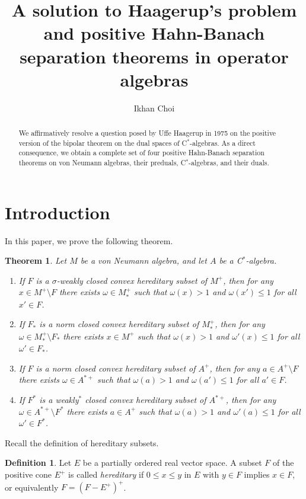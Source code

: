 \documentclass[noamsfonts,a4paper,10pt]{amsart}
\title[Positive Hahn-Banach separation theorems]{A solution to Haagerup's problem and positive Hahn-Banach separation theorems in operator algebras}
\author[I. Choi]{Ikhan Choi}
\theoremstyle{plain}
\newtheorem*{theorem*}{Theorem}
\theoremstyle{definition}
\newtheorem{definition}[theorem]{Definition}
\begin{document}
\begin{abstract}
We affirmatively resolve a question posed by Uffe Haagerup in 1975 on the positive version of the bipolar theorem on the dual spaces of C$^*$-algebras.
As a direct consequence, we obtain a complete set of four positive Hahn-Banach separation theorems on von Neumann algebras, their preduals, C$^*$-algebras, and their duals.
\end{abstract}

\maketitle


\section{Introduction}

In this paper, we prove the following theorem.

\begin{theorem*}
Let $M$ be a von Neumann algebra, and let $A$ be a C$^*$-algebra.
\begin{enumerate}
\item[(1)] If $F$ is a $\sigma$-weakly closed convex hereditary subset of $M^+$, then for any $x\in M^+\setminus F$ there exists $\omega\in M_*^+$ such that $\omega(x)>1$ and $\omega(x')\le1$ for all $x'\in F$.
\item[(2)] If $F_*$ is a norm closed convex hereditary subset of $M_*^+$, then for any $\omega\in M_*^+\setminus F_*$ there exists $x\in M^+$ such that $\omega(x)>1$ and $\omega'(x)\le1$ for all $\omega'\in F_*$.
\item[(3)] If $F$ is a norm closed convex hereditary subset of $A^+$, then for any $a\in A^+\setminus F$\qquad\qquad there exists $\omega\in A^{*+}$ such that $\omega(a)>1$ and $\omega(a')\le1$ for all $a'\in F$.
\item[(4)] If $F^*$ is a weakly$^*$ closed convex hereditary subset of $A^{*+}$, then for any $\omega\in A^{*+}\setminus F^*$ there exists $a\in A^+$ such that $\omega(a)>1$ and $\omega'(a)\le1$ for all $\omega'\in F^*$.
\end{enumerate}
\end{theorem*}

Recall the definition of hereditary subsets.

\begin{definition}
Let $E$ be a partially ordered real vector space.
A subset $F$ of the positive cone $E^+$ is called \emph{hereditary} if $0\le x\le y$ in $E$ with $y\in F$ implies $x\in F$, or equivalently $F=(F-E^+)^+$.
\end{definition}
\end{document}
